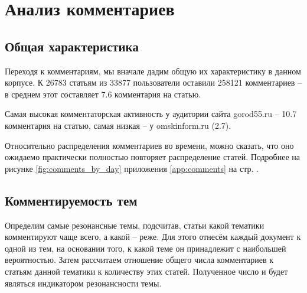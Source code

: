 
\section{Анализ комментариев}
\subsection{Общая характеристика}
Переходя к комментариям, мы вначале дадим общую их характеристику в данном корпусе. К 26783 статьям из 33877 пользователи оставили 258121 комментариев -- в среднем этот составляет 7.6 комментария на статью.

Самая высокая комментаторская активность у аудитории сайта gorod55.ru -- 10.7 комментария на статью, самая низкая -- у omskinform.ru (2.7).

Относительно распределения комментариев во времени, можно сказать, что оно ожидаемо практически полностью повторяет распределение статей. Подробнее на рисунке \ref{fig:comments_by_day} приложения \ref{app:comments} на стр. \pageref{fig:comments_by_day}.

\subsection{Комментируемость тем}
Определим самые резонансные темы, подсчитав, статьи какой тематики комментируют чаще всего, а какой -- реже. Для этого отнесём каждый документ к одной из тем, на основании того, к какой теме он принадлежит с наибольшей вероятностью. Затем рассчитаем отношение общего числа комментариев к статьям данной тематики к количеству этих статей. Полученное число и будет являться индикатором резонансности темы.

